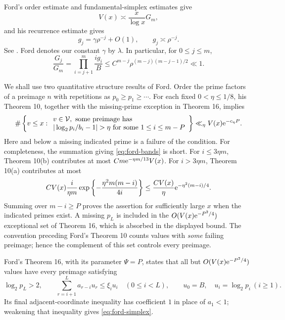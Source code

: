 Ford's order estimate and fundamental-simplex estimates give
\begin{equation}\label{eq:ford-scale}
 V(x)\asymp \frac{x}{\log x}G_m,
\end{equation}
and his recurrence estimate gives
\begin{equation}\label{eq:g-asymptotic}
 g_j=\gamma\rho^{-j}+O(1),\qquad g_j\asymp\rho^{-j}.
\end{equation}
See \cite[Theorem 1, Lemmas 3.4 and 3.7, and Corollary 3.5]
{FordTotients2013}.  Ford denotes our constant \(\gamma\) by
\(\lambda\).  In particular, for \(0\le j\le m\),
\begin{equation}\label{eq:G-uniform}
 \frac{G_j}{G_m}
 =\prod_{i=j+1}^m\frac{ig_i}{B}
 \le C^{m-j}\rho^{(m-j)(m-j-1)/2}\ll1.
\end{equation}

We shall use two quantitative structure results of Ford.
Order the prime factors of a preimage \(n\) with repetitions as
\(p_0\ge p_1\ge\cdots\).
For each fixed \(0<\eta\le1/8\), his Theorem 10, together with the
missing-prime exception in Theorem 16, implies
\begin{equation}\label{eq:ford-bands}
 \#\left\{v\le x:\begin{array}{l}
 v\in\mathcal V,\ \text{some preimage has}\\
 |\log_2p_i/b_i-1|>\eta\text{ for some }1\le i\le m-P
 \end{array}\right\}
 \ll_\eta V(x)\e^{-c_\eta P}.
\end{equation}
Here and below a missing indicated prime is a failure of the condition.
For completeness, the summation giving \eqref{eq:ford-bands} is short.
For \(i\le3\eta m\), Theorem 10(b) contributes at most
\(Cm\mathrm e^{-\eta m/13}V(x)\).  For \(i>3\eta m\), Theorem 10(a)
contributes at most
\[
 C V(x)\frac{i}{\eta m}
 \exp\left\{-\frac{\eta^2m(m-i)}{4i}\right\}
 \le \frac{CV(x)}{\eta}\mathrm e^{-\eta^2(m-i)/4}.
\]
Summing over \(m-i\ge P\) proves the assertion for sufficiently
large \(x\) when the indicated primes exist.  A missing \(p_L\) is
included in the \(O(V(x)\mathrm e^{-P^2/4})\) exceptional set of
Theorem 16, which is absorbed in the displayed bound.
The convention preceding Ford's Theorem 10 counts values
with \emph{some} failing preimage; hence the complement of this set
controls every preimage.

Ford's Theorem 16, with its parameter \(\Psi=P\), states that all but
\(O(V(x)\mathrm e^{-P^2/4})\) values have every preimage satisfying
\begin{equation}\label{eq:ford-simplex}
 \log_2p_L>2,\qquad
 \sum_{r=i+1}^L a_{r-i}u_r\le\xi_i u_i\quad(0\le i<L),
 \qquad u_0=B,\quad u_i=\log_2p_i\ (i\ge1).
\end{equation}
Its final adjacent-coordinate inequality has coefficient \(1\)
in place of \(a_1<1\); weakening that inequality gives
\eqref{eq:ford-simplex}.


